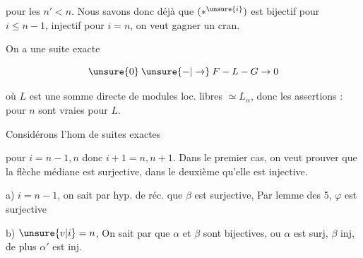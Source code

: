 
pour les $n'<n$.  Nous savons donc déjà que \deleted{\unsure{$\ast$}}$(\ast^{\unsure{i}})$ est bijectif pour $i\leq n-1$, injectif pour $i=n$, on veut gagner un cran.

On a une suite exacte

\[
\unsure{0}\mathbin{\unsure{-|\to}}F\mathbin{-}L\mathbin{-}G\to0
\]

où  $L$ est une somme directe de modules loc. libres  $\simeq L_\alpha$, donc les assertions : pour $n$ sont vraies pour $L$.

Considérons l'hom de suites exactes


pour $i=n-1,n$ donc $i+1=n,n+1$. Dans le premier cas, on veut prouver que la flèche médiane est surjective, dans le deuxième qu'elle est injective.

a) $i=n-1$, on sait par hyp. de réc. que $\beta$ est surjective,    Par lemme des 5, $\varphi$ est  surjective 

b) $\unsure{v|i}=n$, On sait par     que $\alpha$ et $\beta$ sont bijectives, ou $\alpha$ est surj, $\beta$ inj, de plus $\alpha'$ est inj.

